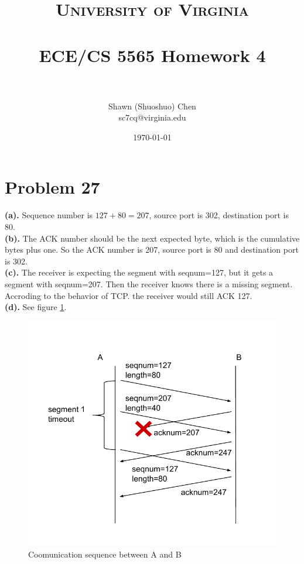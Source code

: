\documentclass[titlepage, paper=a4, fontsize=11pt]{scrartcl} %
\title{	
\normalfont \normalsize 
\textsc{University of Virginia} \\ [25pt] %
\horrule{0.5pt} \\[0.4cm] %
\huge ECE/CS 5565 Homework 4 \\ %
\horrule{2pt} \\[0.5cm] %
}
\author{Shawn (Shuoshuo) Chen\\sc7cq@virginia.edu} %
\date{\normalsize\today} %
\numberwithin{equation}{section} %
\numberwithin{table}{section} %
\begin{document}
\maketitle %


\section*{Problem 27}
\textbf{(a).}
Sequence number is $127+80=207$, source port is 302, destination port is 80. \\

\textbf{(b).}
The ACK number should be the next expected byte, which is the cumulative bytes plus one.
So the ACK number is 207, source port is 80 and destination port is 302. \\

\textbf{(c).}
The receiver is expecting the segment with seqnum=127, but it gets a segment with seqnum=207.
Then the receiver knows there is a missing segment. Accroding to the behavior of TCP. the receiver
would still ACK 127. \\

\textbf{(d).}
See figure \ref{fig:p27}.
\begin{figure}[!ht]
    \includegraphics[width=\textwidth]{images/p27.pdf}
    \caption{Coomunication sequence between A and B}
    \label{fig:p27}
\end{figure}
\\
\end{document}
